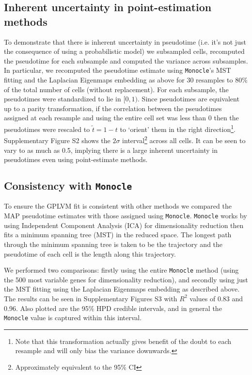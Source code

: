 \subsection{Inherent uncertainty in point-estimation methods} \label{sec:inherentuncert}
To demonstrate that there is inherent uncertainty in pseudotime (i.e. it's not just the consequence of using a probabilistic model) we subsampled cells, recomputed the pseudotime for each subsample and computed the variance across subsamples. In particular, we recomputed the pseudotime estimate using \texttt{Monocle}'s MST fitting and the Laplacian Eigenmaps embedding as above for 30 resamples to 80\% of the total number of cells (without replacement). For each subsample, the pseudotimes were standardized to lie in $[0,1)$. Since pseudotimes are equivalent up to a parity transformation, if the correlation between the pseudotimes assigned at each resample and using the entire cell set was less than 0 then the pseudotimes were rescaled to $\tilde{t} = 1-t$ to `orient' them in the right direction\footnote{Note that this transformation actually gives benefit of the doubt to each resample and will only bias the variance downwards.}. Supplementary Figure S2 shows the $2\sigma$ interval\footnote{Approximately equivalent to the 95\% CI} across all cells. It can be seen to vary to as much as 0.5, implying there is a large inherent uncertainty in pseudotimes even using point-estimate methods.

\subsection{Consistency with \texttt{Monocle}}
To ensure the GPLVM fit is consistent with other methods we compared the MAP pseudotime estimates with those assigned using \texttt{Monocle}. \texttt{Monocle} works by using Independent Component Analysis (ICA) for dimensionality reduction then fits a minimum spanning tree (MST) in the reduced space. The longest path through the minimum spanning tree is taken to be the trajectory and the pseudotime of each cell is the length along this trajectory.

We performed two comparisons: firstly using the entire \texttt{Monocle} method (using the 500 most variable genes for dimensionality reduction), and secondly using just the MST fitting using the Laplacian Eigenmaps embedding as described above. The results can be seen in Supplementary Figures S3 with $R^2$ values of 0.83 and 0.96. Also plotted are the 95\% HPD credible intervals, and in general the \texttt{Monocle} value is captured within this interval.


